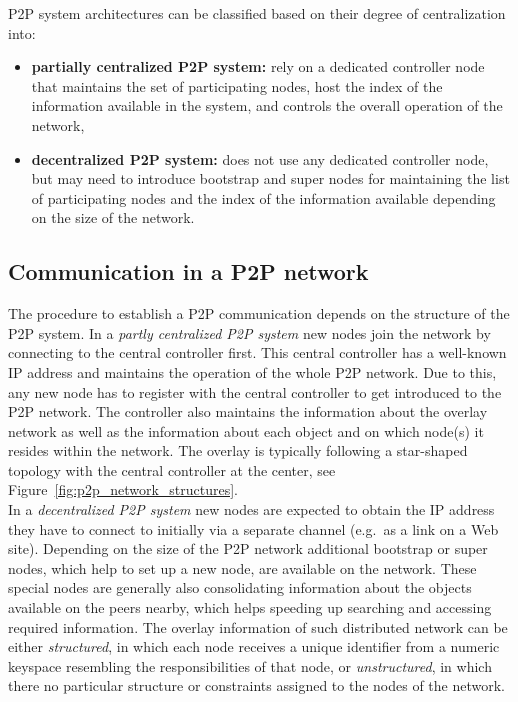 \gls{P2P} system architectures can be classified based on their degree of centralization into: \@

\begin{itemize}
	\item \textbf{partially centralized \gls{P2P} system:} rely on a dedicated controller node that maintains the set of participating nodes, host the index of the information available in the system, and controls the overall operation of the network,
	\item \textbf{decentralized \gls{P2P} system:} does not use any dedicated controller node, but may need to introduce bootstrap and super nodes for maintaining the list of participating nodes and the index of the information available depending on the size of the network.
\end{itemize}


\subsection{Communication in a \gls{P2P} network}
\label{sec:p2p_start_communication}

The procedure to establish a \gls{P2P} communication depends on the structure of the \gls{P2P} system. In a \emph{partly centralized \gls{P2P} system} new nodes join the network by connecting to the central controller first. This central controller has a well-known \gls{IP} address and maintains the operation of the whole \gls{P2P} network. Due to this, any new node has to register with the central controller to get introduced to the \gls{P2P} network. The controller also maintains the information about the overlay network as well as the information about each object and on which node(s) it resides within the network. The overlay is typically following a star-shaped topology with the central controller at the center, see Figure~\ref{fig:p2p_network_structures}. \\

In a \emph{decentralized \gls{P2P} system} new nodes are expected to obtain the \gls{IP} address they have to connect to initially via a separate channel (e.g.\ as a link on a Web site). Depending on the size of the \gls{P2P} network additional bootstrap or super nodes, which help to set up a new node, are available on the network. These special nodes are generally also consolidating information about the objects available on the peers nearby, which helps speeding up searching and accessing required information. The overlay information of such distributed network can be either \emph{structured}, in which each node receives a unique identifier from a numeric keyspace resembling the responsibilities of that node, or \emph{unstructured}, in which there no particular structure or constraints assigned to the nodes of the network. \\

